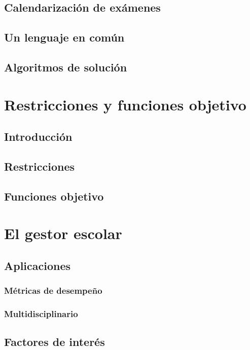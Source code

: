 \documentclass[draft,12pt,headsepline,footsepline,paper=letter]{scrreprt}
\begin{document}
\section{Calendarización de exámenes}

\section{Un lenguaje en común}

\section{Algoritmos de solución}

\chapter{Restricciones y funciones objetivo}

\section{Introducción}

\section{Restricciones}

\section{Funciones objetivo}

\chapter{El gestor escolar}

\section{Aplicaciones}

\subsection{Métricas de desempeño}

\subsection{Multidisciplinario}

\section{Factores de interés}
\end{document}
